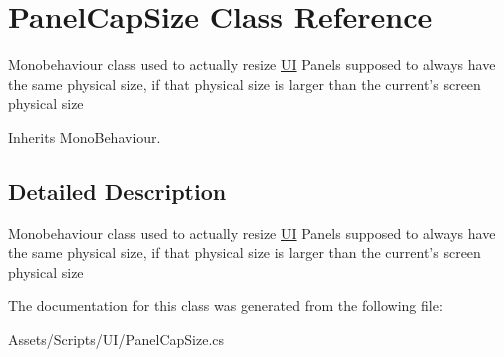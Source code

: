 \hypertarget{class_panel_cap_size}{\section{Panel\-Cap\-Size Class Reference}
\label{class_panel_cap_size}
}


Monobehaviour class used to actually resize \hyperlink{class_u_i}{U\-I} Panels supposed to always have the same physical size, if that physical size is larger than the current's screen physical size  




Inherits Mono\-Behaviour.



\subsection{Detailed Description}
Monobehaviour class used to actually resize \hyperlink{class_u_i}{U\-I} Panels supposed to always have the same physical size, if that physical size is larger than the current's screen physical size 



The documentation for this class was generated from the following file\-:\begin{DoxyCompactItemize}
\item 
Assets/\-Scripts/\-U\-I/Panel\-Cap\-Size.\-cs\end{DoxyCompactItemize}
